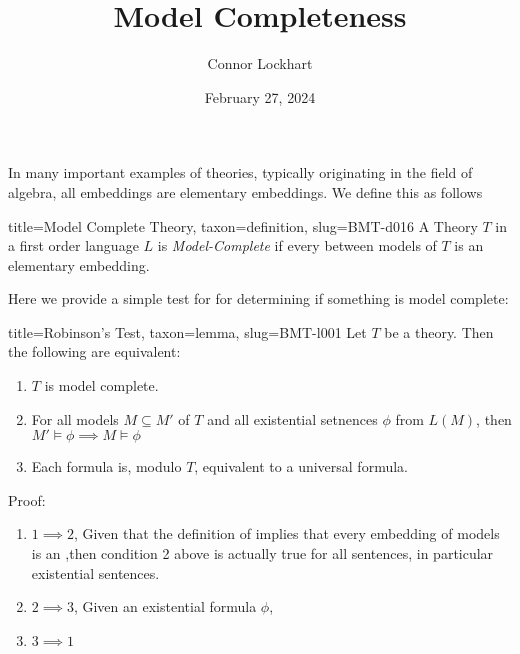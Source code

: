 \documentclass[a4paper]{article}
\title{Model Completeness}
\date{February 27, 2024}
\author{Connor Lockhart}
\begin{document}
\maketitle
\par{In many important examples of theories, typically originating in the field of algebra, all embeddings are elementary embeddings. We define this as follows}
\begin{tree}{title={Model Complete Theory}, taxon={definition}, slug={BMT-d016}}
A Theory \(T\) in a first order language \(L\) is \emph{Model-Complete} if  every  between models of \(T\) is an elementary embedding. 
\end{tree}
\par{Here we provide a simple test for for determining if something is model complete:}
\begin{tree}{title={Robinson's Test}, taxon={lemma}, slug={BMT-l001}}
 Let \(T\) be a theory. Then the following are equivalent:\begin{enumerate}
\item{\(T\) is model complete.}
    \item{For all models \(M \subseteq  M'\) of \(T\) and all existential setnences \(\phi\) from \(L(M)\), then \(M' \vDash   \phi   \implies  M  \vDash   \phi\)}
    \item{Each formula is, modulo \(T\), equivalent to a universal formula. }
\end{enumerate}\par{Proof: }\begin{enumerate}
\item{\(1 \implies  2\), Given that the definition of  implies that every embedding of models is an ,then condition 2 above is actually true for all sentences, in particular existential sentences. }
    \item{\(2 \implies  3\), Given an existential formula \(\phi\),  }
    \item{\(3 \implies  1\)}
\end{enumerate}
\end{tree}

\printbibliography
\end{document}
